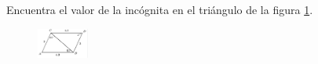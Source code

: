 \question[10]  Encuentra el valor de la incógnita en el triángulo de la figura \ref{fig:angle_triangle_20}.
\begin{figure}[H]
    \begin{center}
        \includegraphics[width=0.15\textwidth]{../images/angle_triangle_20.png}
    \end{center}
    \caption{}
    \label{fig:angle_triangle_20}
\end{figure}